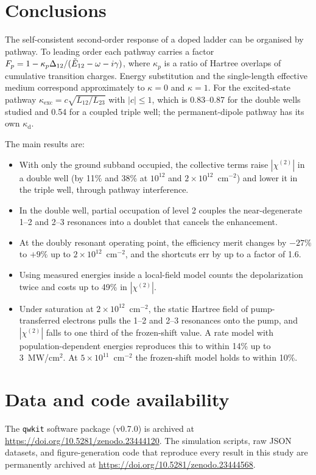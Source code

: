 \documentclass[11pt]{article}
\newcommand{\chitwo}{\chi^{(2)}}
\newcommand{\Et}{\tilde E}
\let\hbar\relax\DeclareRobustCommand{\hbar}{{\mathchar'26\mkern-9mu h}}
\begin{document}
\section{Conclusions}
The self-consistent second-order response of a doped ladder can be organised by pathway. To leading order each pathway carries a factor $F_p=1-\kappa_p\Delta_{12}/(\Et_{12}-\hbar\omega-i\gamma)$, where $\kappa_p$ is a ratio of Hartree overlaps of cumulative transition charges. Energy substitution and the single-length effective medium correspond approximately to $\kappa=0$ and $\kappa=1$. For the excited-state pathway $\kappa_\mathrm{exc}=c\sqrt{L_{12}/L_{23}}$ with $|c|\le1$, which is 0.83--0.87 for the double wells studied and 0.54 for a coupled triple well; the permanent-dipole pathway has its own $\kappa_\mathrm{d}$.

The main results are:
\begin{itemize}
\item With only the ground subband occupied, the collective terms raise $|\chitwo|$ in a double well (by 11\% and 38\% at $10^{12}$ and $2\times10^{12}$~cm$^{-2}$) and lower it in the triple well, through pathway interference.
\item In the double well, partial occupation of level 2 couples the near-degenerate 1--2 and 2--3 resonances into a doublet that cancels the enhancement.
\item At the doubly resonant operating point, the efficiency merit changes by $-27\%$ to $+9\%$ up to $2\times10^{12}$~cm$^{-2}$, and the shortcuts err by up to a factor of 1.6.
\item Using measured energies inside a local-field model counts the depolarization twice and costs up to 49\% in $|\chitwo|$.
\item Under saturation at $2\times10^{12}$~cm$^{-2}$, the static Hartree field of pump-transferred electrons pulls the 1--2 and 2--3 resonances onto the pump, and $|\chitwo|$ falls to one third of the frozen-shift value. A rate model with population-dependent energies reproduces this to within 14\% up to 3~MW/cm$^2$. At $5\times10^{11}$~cm$^{-2}$ the frozen-shift model holds to within 10\%.
\end{itemize}

\section*{Data and code availability}
The \texttt{qwkit} software package (v0.7.0) is archived at \url{https://doi.org/10.5281/zenodo.23444120}. The simulation scripts, raw JSON datasets, and figure-generation code that reproduce every result in this study are permanently archived at \url{https://doi.org/10.5281/zenodo.23444568}.



\end{document}
